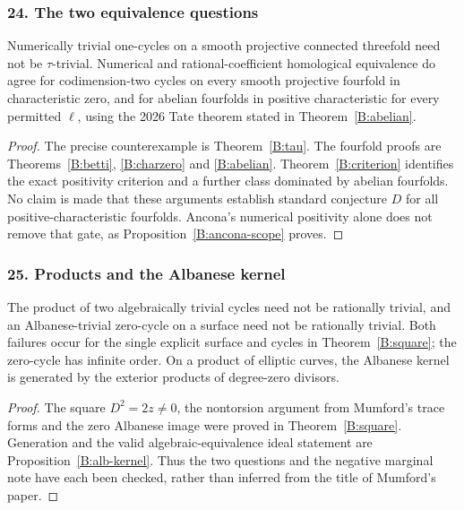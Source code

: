 \subsubsection{24. The two equivalence questions}
\begin{corollary}\label{B:subject24}
Numerically trivial one-cycles on a smooth projective connected threefold need not be $\tau$-trivial. Numerical and rational-coefficient homological equivalence do agree for codimension-two cycles on every smooth projective fourfold in characteristic zero, and for abelian fourfolds in positive characteristic for every permitted $\ell$, using the 2026 Tate theorem stated in Theorem~\ref{B:abelian}.
\end{corollary}
\begin{proof}
The precise counterexample is Theorem~\ref{B:tau}. The fourfold proofs are Theorems~\ref{B:betti}, \ref{B:charzero} and \ref{B:abelian}. Theorem~\ref{B:criterion} identifies the exact positivity criterion and a further class dominated by abelian fourfolds. No claim is made that these arguments establish standard conjecture $D$ for all positive-characteristic fourfolds. Ancona's numerical positivity alone does not remove that gate, as Proposition~\ref{B:ancona-scope} proves.
\end{proof}

\subsubsection{25. Products and the Albanese kernel}
\begin{corollary}\label{B:subject25}
The product of two algebraically trivial cycles need not be rationally trivial, and an Albanese-trivial zero-cycle on a surface need not be rationally trivial. Both failures occur for the single explicit surface and cycles in Theorem~\ref{B:square}; the zero-cycle has infinite order. On a product of elliptic curves, the Albanese kernel is generated by the exterior products of degree-zero divisors.
\end{corollary}
\begin{proof}
The square $D^2=2z\ne0$, the nontorsion argument from Mumford's trace forms and the zero Albanese image were proved in Theorem~\ref{B:square}. Generation and the valid algebraic-equivalence ideal statement are Proposition~\ref{B:alb-kernel}. Thus the two questions and the negative marginal note have each been checked, rather than inferred from the title of Mumford's paper.
\end{proof}

